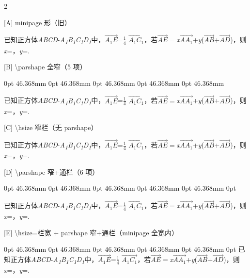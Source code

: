 \documentclass[fontset=none]{ctexart}
\begin{document}
\begin{multicols}{2}
\def\QPTEXT{已知正方体\emph{ABCD}-\emph{A\textsubscript{1}B\textsubscript{1}C\textsubscript{1}D\textsubscript{1}}中，\(\overrightarrow{A_{1}E}\)=\(\frac{1}{4}\) \(\overrightarrow{A_{1}C_{1}}\)，若\(\overrightarrow{AE} =\)\emph{x}\(\overrightarrow{AA_{1}}\)+\emph{y}(\(\overrightarrow{AB}\)+\(\overrightarrow{AD}\))，则\emph{x}\nobreak=\kongbai{}，\emph{y}\nobreak=\kongbai{}.}

[A] minipage 形（旧）\par
\noindent\begin{minipage}[t]{46.368mm}\raggedright \QPTEXT\end{minipage}\par
\vspace{3mm}

[B] \textbackslash parshape 全窄（5 项）\par
\noindent\begingroup{} 0pt 46.368mm 0pt 46.368mm 0pt 46.368mm 0pt 46.368mm 0pt 46.368mm\raggedright
\QPTEXT\par\endgroup
\vspace{3mm}

[C] \textbackslash hsize 窄栏（无 parshape）\par
\noindent\begingroup\hsize=46.368mm\raggedright \QPTEXT\par\endgroup
\vspace{3mm}

[D] \textbackslash parshape 窄+通栏（6 项）\par
\noindent\begingroup{} 0pt 46.368mm 0pt 46.368mm 0pt 46.368mm 0pt 46.368mm 0pt 46.368mm 0pt \linewidth\raggedright
\QPTEXT\par\endgroup
\vspace{3mm}

[E] \textbackslash hsize=栏宽 + parshape 窄+通栏（minipage 全宽内）\par
\noindent\begin{minipage}[t]{\linewidth}\raggedright
{} 0pt 46.368mm 0pt 46.368mm 0pt 46.368mm 0pt 46.368mm 0pt 46.368mm 0pt \linewidth
\QPTEXT\par\end{minipage}\par
\end{multicols}
\end{document}
